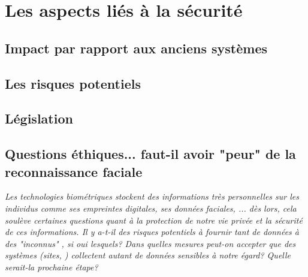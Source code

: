 \section{Les aspects liés à la sécurité}

\subsection{Impact par rapport aux anciens systèmes}
\subsection{Les risques potentiels}
\subsection{Législation}
\subsection{Questions éthiques... faut-il avoir "peur" de la reconnaissance faciale}
\textcolor{dkblue}{\textit{Les technologies biométriques stockent des informations très personnelles sur les individus comme ses empreintes digitales, ses données faciales, ... dès lors, cela soulève certaines questions quant à la protection de notre vie privée et la sécurité de ces informations. Il y a-t-il des risques potentiels à fournir tant de données à des "inconnus" , si oui lesquels? Dans quelles mesures peut-on accepter que des systèmes (sites, ) collectent autant de données sensibles à notre égard? Quelle serait-la prochaine étape?}}
